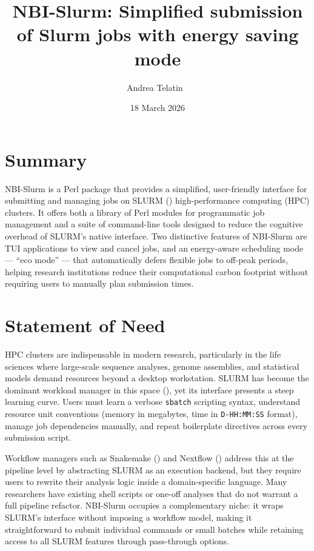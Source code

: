 \documentclass[
]{article}
\title{NBI-Slurm: Simplified submission of Slurm jobs with energy saving
mode}
\author[1,2%
  ]{Andrea Telatin%
    \,\orcidlink{0000-0001-7619-281X}\,%
    }
\affil[1]{Quadram Institute Bioscience, Norwich, NR4 7UQ, UK%
    \,\protect\href{https://ror.org/04td3ys19}{\protect\rorlogo}\,%
  }
\affil[2]{Center for Microbial Interactions, Norwich Research Park,
Norwich, NR4 7UG, UK%
  }
\date{18 March 2026}
\begin{document}
\maketitle

\section{Summary}\label{summary}

NBI-Slurm is a Perl package that provides a simplified, user-friendly
interface for submitting and managing jobs on SLURM
() high-performance
computing (HPC) clusters. It offers both a library of Perl modules for
programmatic job management and a suite of command-line tools designed
to reduce the cognitive overhead of SLURM's native interface. Two
distinctive features of NBI-Slurm are TUI applications to view and
cancel jobs, and an energy-aware scheduling mode --- ``eco mode'' ---
that automatically defers flexible jobs to off-peak periods, helping
research institutions reduce their computational carbon footprint
without requiring users to manually plan submission times.

\section{Statement of Need}\label{statement-of-need}

HPC clusters are indispensable in modern research, particularly in the
life sciences where large-scale sequence analyses, genome assemblies,
and statistical models demand resources beyond a desktop workstation.
SLURM has become the dominant workload manager in this space
(), yet its interface
presents a steep learning curve. Users must learn a verbose
\texttt{sbatch} scripting syntax, understand resource unit conventions
(memory in megabytes, time in \texttt{D-HH:MM:SS} format), manage job
dependencies manually, and repeat boilerplate directives across every
submission script.

Workflow managers such as Snakemake
() and Nextflow
() address this at
the pipeline level by abstracting SLURM as an execution backend, but
they require users to rewrite their analysis logic inside a
domain-specific language. Many researchers have existing shell scripts
or one-off analyses that do not warrant a full pipeline refactor.
NBI-Slurm occupies a complementary niche: it wraps SLURM's interface
without imposing a workflow model, making it straightforward to submit
individual commands or small batches while retaining access to all SLURM
features through pass-through options.
\end{document}
